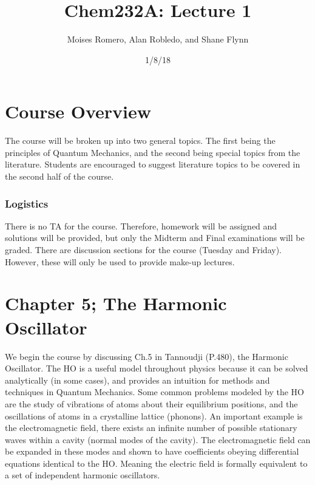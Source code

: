 \documentclass{article}
\title{Chem232A: Lecture 1}
\date{1/8/18}
\author{Moises Romero, Alan Robledo, and Shane Flynn}
\begin{document}
\maketitle

\section*{Course Overview}
The course will be broken up into two general topics.
The first being the principles of Quantum Mechanics, and the second being special topics from the literature.
Students are encouraged to suggest literature topics to be covered in the second half of the course.

\subsubsection*{Logistics}
There is no TA for the course. Therefore, homework will be assigned and solutions will be provided, but only the Midterm and Final examinations will be graded.
There are discussion sections for the course (Tuesday and Friday). However, these will only be used to provide make-up lectures.

\section*{Chapter 5; The Harmonic Oscillator}
We begin the course by discussing Ch.5 in Tannoudji (P.480), the Harmonic Oscillator.
The HO is a useful model throughout physics because it can be solved analytically (in some cases), and provides an intuition for methods and techniques in Quantum Mechanics.
Some common problems modeled by the HO are the study of vibrations of atoms about their equilibrium positions, and the oscillations of atoms in a crystalline lattice (phonons).
An important example is the electromagnetic field, there  exists an  infinite number of possible stationary waves within a cavity (normal modes of the cavity).
The electromagnetic field can be expanded in these modes and shown to have coefficients obeying differential equations identical to the HO.
Meaning the electric field is formally equivalent to a set of independent harmonic oscillators.
\end{document}
